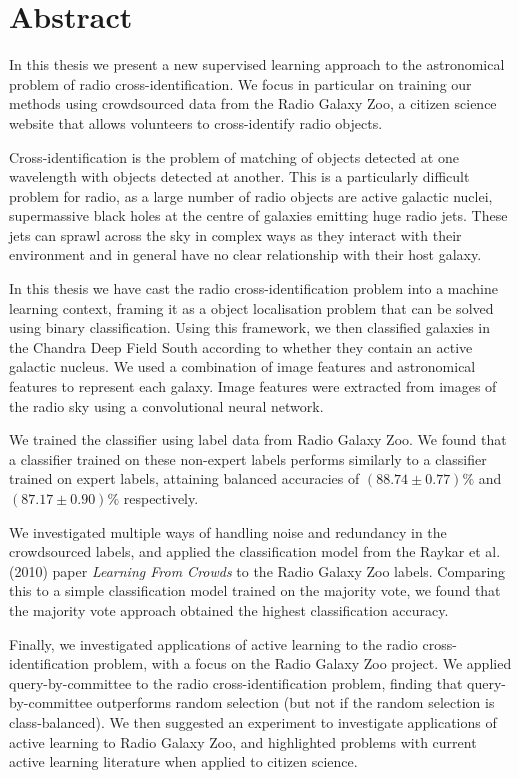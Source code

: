 \chapter*{Abstract}
\label{cha:abstract}

In this thesis we present a new supervised learning approach to the astronomical
problem of radio cross-identification. We focus in particular on training our
methods using crowdsourced data from the Radio Galaxy Zoo, a citizen science
website that allows volunteers to cross-identify radio objects.

Cross-identification is the problem of matching of objects detected at one
wavelength with objects detected at another. This is a particularly difficult
problem for radio, as a large number of radio objects are active galactic
nuclei, supermassive black holes at the centre of galaxies emitting huge radio
jets. These jets can sprawl across the sky in complex ways as they interact with
their environment and in general have no clear relationship with their host
galaxy.

In this thesis we have cast the radio cross-identification problem into a
machine learning context, framing it as a object localisation problem that can
be solved using binary classification. Using this framework, we then classified
galaxies in the Chandra Deep Field South according to whether they contain an
active galactic nucleus. We used a combination of image features and
astronomical features to represent each galaxy. Image features were extracted
from images of the radio sky using a convolutional neural network.

We trained the classifier using label data from Radio Galaxy Zoo. We found that
a classifier trained on these non-expert labels performs similarly to a
classifier trained on expert labels, attaining balanced accuracies of $(88.74
\pm 0.77)\%$ and $(87.17 \pm 0.90)\%$ respectively.

We investigated multiple ways of handling noise and redundancy in the
crowdsourced labels, and applied the classification model from the Raykar et al.
(2010) paper \emph{Learning From Crowds} to the Radio Galaxy Zoo labels.
Comparing this to a simple classification model trained on the majority vote, we
found that the majority vote approach obtained the highest classification
accuracy.

Finally, we investigated applications of active learning to the radio
cross-identification problem, with a focus on the Radio Galaxy Zoo project. We
applied query-by-committee to the radio cross-identification problem, finding
that query-by-committee outperforms random selection (but not if the random
selection is class-balanced). We then suggested an experiment to investigate
applications of active learning to Radio Galaxy Zoo, and highlighted problems
with current active learning literature when applied to citizen science.
